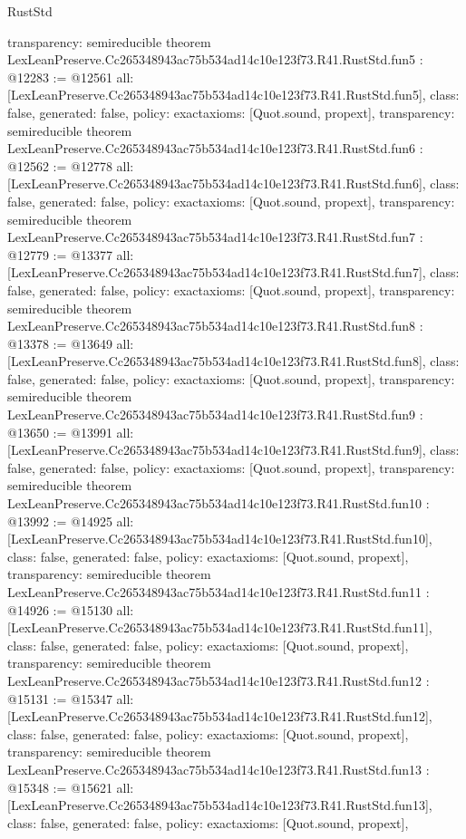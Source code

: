 \begin{lexlean}{RustStd}
\begin{coremodule}
{  transparency: semireducible
}
theorem LexLeanPreserve.Cc265348943ac75b534ad14c10e123f73.R41.RustStd.fun5 : @12283 := @12561 {
  all: [LexLeanPreserve.Cc265348943ac75b534ad14c10e123f73.R41.RustStd.fun5],
  class: false,
  generated: false,
  policy: exact{axioms: [Quot.sound, propext]},
  transparency: semireducible
}
theorem LexLeanPreserve.Cc265348943ac75b534ad14c10e123f73.R41.RustStd.fun6 : @12562 := @12778 {
  all: [LexLeanPreserve.Cc265348943ac75b534ad14c10e123f73.R41.RustStd.fun6],
  class: false,
  generated: false,
  policy: exact{axioms: [Quot.sound, propext]},
  transparency: semireducible
}
theorem LexLeanPreserve.Cc265348943ac75b534ad14c10e123f73.R41.RustStd.fun7 : @12779 := @13377 {
  all: [LexLeanPreserve.Cc265348943ac75b534ad14c10e123f73.R41.RustStd.fun7],
  class: false,
  generated: false,
  policy: exact{axioms: [Quot.sound, propext]},
  transparency: semireducible
}
theorem LexLeanPreserve.Cc265348943ac75b534ad14c10e123f73.R41.RustStd.fun8 : @13378 := @13649 {
  all: [LexLeanPreserve.Cc265348943ac75b534ad14c10e123f73.R41.RustStd.fun8],
  class: false,
  generated: false,
  policy: exact{axioms: [Quot.sound, propext]},
  transparency: semireducible
}
theorem LexLeanPreserve.Cc265348943ac75b534ad14c10e123f73.R41.RustStd.fun9 : @13650 := @13991 {
  all: [LexLeanPreserve.Cc265348943ac75b534ad14c10e123f73.R41.RustStd.fun9],
  class: false,
  generated: false,
  policy: exact{axioms: [Quot.sound, propext]},
  transparency: semireducible
}
theorem LexLeanPreserve.Cc265348943ac75b534ad14c10e123f73.R41.RustStd.fun10 : @13992 := @14925 {
  all: [LexLeanPreserve.Cc265348943ac75b534ad14c10e123f73.R41.RustStd.fun10],
  class: false,
  generated: false,
  policy: exact{axioms: [Quot.sound, propext]},
  transparency: semireducible
}
theorem LexLeanPreserve.Cc265348943ac75b534ad14c10e123f73.R41.RustStd.fun11 : @14926 := @15130 {
  all: [LexLeanPreserve.Cc265348943ac75b534ad14c10e123f73.R41.RustStd.fun11],
  class: false,
  generated: false,
  policy: exact{axioms: [Quot.sound, propext]},
  transparency: semireducible
}
theorem LexLeanPreserve.Cc265348943ac75b534ad14c10e123f73.R41.RustStd.fun12 : @15131 := @15347 {
  all: [LexLeanPreserve.Cc265348943ac75b534ad14c10e123f73.R41.RustStd.fun12],
  class: false,
  generated: false,
  policy: exact{axioms: [Quot.sound, propext]},
  transparency: semireducible
}
theorem LexLeanPreserve.Cc265348943ac75b534ad14c10e123f73.R41.RustStd.fun13 : @15348 := @15621 {
  all: [LexLeanPreserve.Cc265348943ac75b534ad14c10e123f73.R41.RustStd.fun13],
  class: false,
  generated: false,
  policy: exact{axioms: [Quot.sound, propext]},
}
\end{coremodule}
\end{lexlean}
